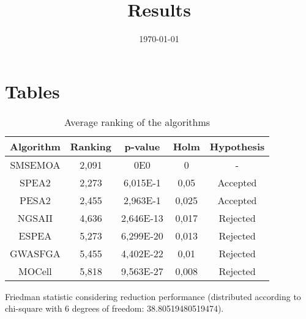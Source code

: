 \documentclass{article}
\title{Results}
\author{}
\date{\today}
\begin{document}
\oddsidemargin 0in \topmargin 0in\maketitle

\section{Tables}
\begin{table}[!htp]
\centering
\begin{tabular}{c|c|c|c|c}
Algorithm&Ranking&p-value&Holm&Hypothesis\\
\hline
SMSEMOA & 2,091 & 0E0 & 0 & -\\
SPEA2 & 2,273 & 6,015E-1 & 0,05 & Accepted\\
PESA2 & 2,455 & 2,963E-1 & 0,025 & Accepted\\
NGSAII & 4,636 & 2,646E-13 & 0,017 & Rejected\\
ESPEA & 5,273 & 6,299E-20 & 0,013 & Rejected\\
GWASFGA & 5,455 & 4,402E-22 & 0,01 & Rejected\\
MOCell & 5,818 & 9,563E-27 & 0,008 & Rejected\\
\end{tabular}
\caption{Average ranking of the algorithms}
\end{table}


Friedman statistic considering reduction performance (distributed according to chi-square with 6 degrees of freedom: 38.80519480519474).
\end{document}
